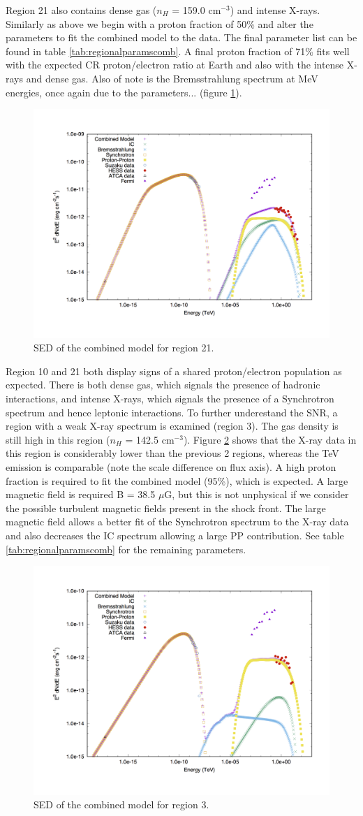 \documentclass[12pt,a4paper]{article}
\begin{document}
Region 21 also contains dense gas ($n_H$ = 159.0 cm$^{-3}$) and intense X-rays. Similarly as above we begin with a proton fraction of 50\% and alter the parameters to fit the combined model to the data. The final parameter list can be found in table \ref{tab:regionalparamscomb}. A final proton fraction of 71\% fits well with the expected CR proton/electron ratio at Earth and also with the intense X-rays and dense gas. Also of note is the Bremsstrahlung spectrum at MeV energies, once again due to the parameters... (figure \ref{fig:rxj1713comb21}).
\begin{figure}[H]
	\centering
	\includegraphics[width=0.4\linewidth, height=0.3\textheight, angle=-90]{rxj1713_comb21}
	\caption{SED of the combined model for region 21.}
	\label{fig:rxj1713comb21}
\end{figure}

Region 10 and 21 both display signs of a shared proton/electron population as expected. There is both dense gas, which signals the presence of hadronic interactions, and intense X-rays, which signals the presence of a Synchrotron spectrum and hence leptonic interactions. To further underestand the SNR, a region with a weak X-ray spectrum is examined (region 3). The gas density is still high in this region ($n_H$ = 142.5 cm$^{-3}$). Figure \ref{fig:rxj1713comb3} shows that the X-ray data in this region is considerably lower than the previous 2 regions, whereas the TeV emission is comparable (note the scale difference on flux axis). A high proton fraction is required to fit the combined model (95\%), which is expected. A large magnetic field is required B = 38.5 $\mu$G, but this is not unphysical if we consider the possible turbulent magnetic fields present in the shock front. The large magnetic field allows a better fit of the Synchrotron spectrum to the X-ray data and also decreases the IC spectrum allowing a large PP contribution. See table \ref{tab:regionalparamscomb} for the remaining parameters.
\begin{figure}[H]
	\centering
	\includegraphics[width=0.4\linewidth, height=0.3\textheight, angle=-90]{rxj1713_comb3}
	\caption{SED of the combined model for region 3.}
	\label{fig:rxj1713comb3}
\end{figure}
\end{document}
